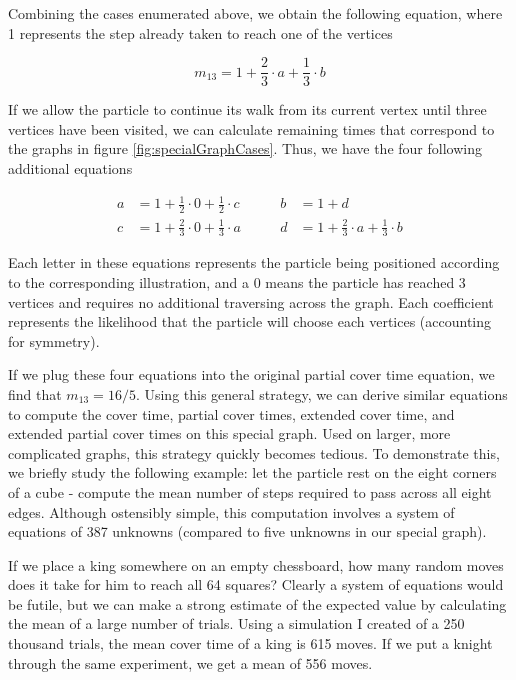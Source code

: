 \documentclass[11pt]{article}
\begin{document}
Combining the cases enumerated above, we obtain the following equation, where 1 represents the step already taken to reach one of the vertices

\begin{equation}
m_{13} = 1 + \frac{2}{3} \cdot a + \frac{1}{3} \cdot b
\end{equation}

If we allow the particle to continue its walk from its current vertex until three vertices have been visited, we can calculate remaining times that correspond to the graphs in figure \ref{fig:specialGraphCases}. Thus, we have the four following additional equations

\begin{equation}
\begin{alignedat}{2}
    a &= 1 + \frac{1}{2} \cdot 0 + \frac{1}{2} \cdot c \qquad
    &b &= 1 + d \\
    c &= 1 + \frac{2}{3} \cdot 0 + \frac{1}{3} \cdot a \qquad
    &d &= 1 + \frac{2}{3} \cdot a + \frac{1}{3} \cdot b
\end{alignedat}
\end{equation}

Each letter in these equations represents the particle being positioned according to the corresponding illustration, and a 0 means the particle has reached 3 vertices and requires no additional traversing across the graph. Each coefficient represents the likelihood that the particle will choose each vertices (accounting for symmetry). 

If we plug these four equations into the original partial cover time equation, we find that \textit{$m_{13} = 16/5$}. Using this general strategy, we can derive similar equations to compute the cover time, partial cover times, extended cover time, and extended partial cover times on this special graph. Used on larger, more complicated graphs, this strategy quickly becomes tedious. To demonstrate this, we briefly study the following example: let the particle rest on the eight corners of a cube - compute the mean number of steps required to pass across all eight edges. Although ostensibly simple, this computation involves a system of equations of 387 unknowns (compared to five unknowns in our special graph).

If we place a king somewhere on an empty chessboard, how many random moves does it take for him to reach all 64 squares? Clearly a system of equations would be futile, but we can make a strong estimate of the expected value by calculating the mean of a large number of trials. Using a simulation I created of a 250 thousand trials, the mean cover time of a king is 615 moves. If we put a knight through the same experiment, we get a mean of 556 moves. 
\end{document}
